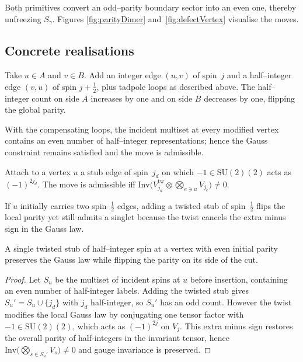 \documentclass[11pt]{article}
\newcommand{\SU}{\mathrm{SU}(2)}
\newcommand{\Inv}{\mathrm{Inv}}
\newcommand{\Cut}{\gamma}
\begin{document}
Both primitives convert an odd–parity boundary sector into an even one,
thereby unfreezing $S_\Cut$.  Figures \ref{fig:parityDimer}
and~\ref{fig:defectVertex} visualise the moves.

\subsection*{Concrete realisations}

\begin{example}\label{ex:paritydimer}
Take $u\in A$ and $v\in B$.  Add an integer edge $(u,v)$ of spin~$j$ and a
half–integer edge $(v,u)$ of spin $j+\tfrac12$, plus tadpole loops as
described above.  The half–integer count on side $A$ increases by one and
on side $B$ decreases by one, flipping the global parity.
\end{example}

\begin{lemma}\label{lem:dimerGauge}
With the compensating loops, the incident multiset at every modified
vertex contains an even number of half–integer representations; hence
the Gauss constraint remains satisfied and the move is admissible.
\end{lemma}

\begin{definition}\label{def:defectAdmissible}
Attach to a vertex $u$ a stub edge of spin~$j_d$ on which
$-1\in\SU(2)$ acts as $(-1)^{2j_d}$.  The move is admissible iff
\(
  \Inv\bigl(V_{j_d}^{\mathrm{tw}}\!\otimes\!
            \bigotimes_{e\ni u} V_{j_e}\bigr)\neq0.
\)
\end{definition}

\begin{example}\label{ex:defect}
If $u$ initially carries two spin–$\tfrac12$ edges, adding a twisted stub
of spin~$\tfrac12$ flips the local parity yet still admits a singlet
because the twist cancels the extra minus sign in the Gauss law.
\end{example}

\begin{lemma}\label{lem:defectGauge}
A single twisted stub of half–integer spin at a vertex with even initial
parity preserves the Gauss law while flipping the parity on its side of
the cut.
\end{lemma}

\begin{proof}
Let $S_u$ be the multiset of incident spins at $u$ before insertion,
containing an even number of half-integer labels.  Adding the twisted
stub gives $S_u' = S_u\cup\{j_d\}$ with $j_d$ half-integer, so
$S_u'$ has an odd count.  However the twist modifies the local Gauss
law by conjugating one tensor factor with $-1\!\in\!\SU(2)$, which acts
as $(-1)^{2j}$ on $V_j$.  This extra minus sign restores the overall
parity of half-integers in the invariant tensor, hence
$\Inv\!\bigl(\!\bigotimes_{s\in S_u'}V_s\bigr)\neq0$ and gauge
invariance is preserved.
\end{proof}
\end{document}
